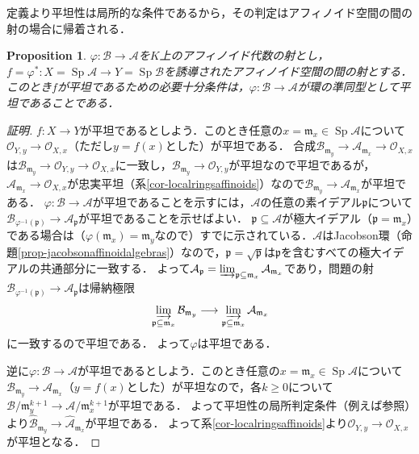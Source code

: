 \documentclass[a4paper,12pt, dvipdfmx]{jsbook}
\def\O{\mathscr{O}}
\def\m{\mathfrak{m}}
\def\Sp{\mathop{\mathrm{Sp}}\nolimits}
\theoremstyle{plain}
\newtheorem{prop}[thm]{\bfseries Proposition}
\theoremstyle{definition}
\begin{document}
定義より平坦性は局所的な条件であるから，その判定はアフィノイド空間の間の射の場合に帰着される．
\begin{prop}\label{prop-flatmorphisms}{\rm 
$\varphi\colon\mathcal{B}\rightarrow\mathcal{A}$を$K$上のアフィノイド代数の射とし，$f=\varphi^{\ast}\colon X=\Sp\mathcal{A}\rightarrow Y=\Sp\mathcal{B}$を誘導されたアフィノイド空間の間の射とする．
このとき$f$が平坦であるための必要十分条件は，$\varphi\colon\mathcal{B}\rightarrow\mathcal{A}$が環の準同型として平坦であることである．}
\end{prop}

\begin{proof}[証明]
$f\colon X\rightarrow Y$が平坦であるとしよう．このとき任意の$x=\m_x\in\Sp\mathcal{A}$について$\O_{Y,y}\rightarrow\O_{X,x}$（ただし$y=f(x)$とした）が平坦である．
合成$\mathcal{B}_{\m_y}\rightarrow\mathcal{A}_{\m_x}\rightarrow\O_{X,x}$は$\mathcal{B}_{\m_y}\rightarrow\O_{Y,y}\rightarrow\O_{X,x}$に一致し，$\mathcal{B}_{\m_y}\rightarrow\O_{Y,y}$が平坦なので平坦であるが，$\mathcal{A}_{\m_x}\rightarrow\O_{X,x}$が忠実平坦（系\ref{cor-localringsaffinoids}）なので$\mathcal{B}_{\m_y}\rightarrow\mathcal{A}_{\m_x}$が平坦である．
$\varphi\colon\mathcal{B}\rightarrow\mathcal{A}$が平坦であることを示すには，$\mathcal{A}$の任意の素イデアル$\mathfrak{p}$について$\mathcal{B}_{\varphi^{-1}(\mathfrak{p})}\rightarrow\mathcal{A}_{\mathfrak{p}}$が平坦であることを示せばよい．
$\mathfrak{p}\subseteq\mathcal{A}$が極大イデアル（$\mathfrak{p}=\m_x$）である場合は（$\varphi(\m_x)=\m_y$なので）すでに示されている．$\mathcal{A}$はJacobson環（命題\ref{prop-jacobsonaffinoidalgebras}）なので，$\mathfrak{p}=\sqrt{\mathfrak{p}}$は$\mathfrak{p}$を含むすべての極大イデアルの共通部分に一致する．
よって$\mathcal{A}_{\mathfrak{p}}=\varinjlim_{\mathfrak{p}\subseteq\m_x}\mathcal{A}_{\m_x}$であり，問題の射$\mathcal{B}_{\varphi^{-1}(\mathfrak{p})}\rightarrow\mathcal{A}_{\mathfrak{p}}$は帰納極限
$$
\varinjlim_{\mathfrak{p}\subseteq\m_x}\mathcal{B}_{\m_y}\longrightarrow\varinjlim_{\mathfrak{p}\subseteq\m_x}\mathcal{A}_{\m_x}
$$
に一致するので平坦である．
よって$\varphi$は平坦である．

逆に$\varphi\colon\mathcal{B}\rightarrow\mathcal{A}$が平坦であるとしよう．このとき任意の$x=\m_x\in\Sp\mathcal{A}$について$\mathcal{B}_{\m_y}\rightarrow\mathcal{A}_{\m_x}$（$y=f(x)$とした）が平坦なので，各$k\geq 0$について$\mathcal{B}/\m^{k+1}_y\rightarrow\mathcal{A}/\m^{k+1}_x$が平坦である．
よって平坦性の局所判定条件（例えば\cite[Theorem 22.4]{Matsu}参照）より$\widehat{\mathcal{B}}_{\m_y}\rightarrow\widehat{\mathcal{A}}_{\m_x}$が平坦である．
よって系\ref{cor-localringsaffinoids}より$\O_{Y,y}\rightarrow\O_{X,x}$が平坦となる．
\end{proof}
\end{document}
